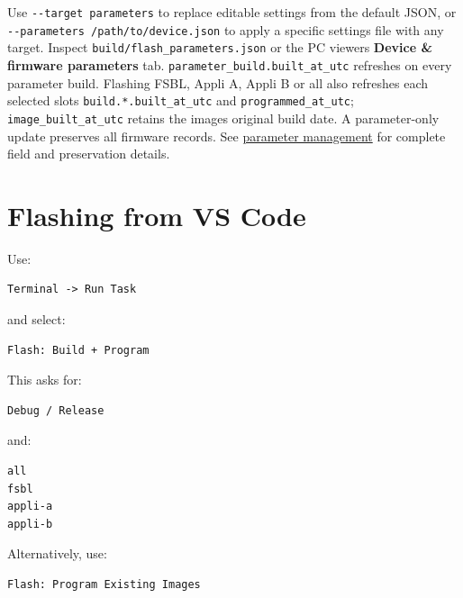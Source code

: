 \documentclass[10pt,a4paper,oneside]{report}
\begin{document}
Use \texttt{-\allowbreak{}-\allowbreak{}target parameters} to replace editable settings from the default JSON, or \texttt{-\allowbreak{}-\allowbreak{}parameters /\allowbreak{}path/\allowbreak{}to/\allowbreak{}device.\allowbreak{}json} to apply a specific settings file with any target. Inspect \texttt{build/\allowbreak{}flash\_\allowbreak{}parameters.\allowbreak{}json} or the PC viewer\textquotesingle s \textbf{Device \& firmware parameters} tab. \texttt{parameter\_\allowbreak{}build.\allowbreak{}built\_\allowbreak{}at\_\allowbreak{}utc} refreshes on every parameter build. Flashing FSBL, Appli A, Appli B or all also refreshes each selected slot\textquotesingle s \texttt{build.\allowbreak{}*.\allowbreak{}built\_\allowbreak{}at\_\allowbreak{}utc} and \texttt{programmed\_\allowbreak{}at\_\allowbreak{}utc}; \texttt{image\_\allowbreak{}built\_\allowbreak{}at\_\allowbreak{}utc} retains the image\textquotesingle s original build date. A parameter-only update preserves all firmware records. See \hyperref[wiki-firmware-parameters--device-parameters-and-build-metadata]{parameter management} for complete field and preservation details.

\section{Flashing from VS Code}\label{wiki-getting-started-build-flash-debug--6-flashing-from-vs-code}

Use:

\begin{verbatim}
Terminal -> Run Task
\end{verbatim}

and select:

\begin{verbatim}
Flash: Build + Program
\end{verbatim}

This asks for:

\begin{verbatim}
Debug / Release
\end{verbatim}

and:

\begin{verbatim}
all
fsbl
appli-a
appli-b
\end{verbatim}

Alternatively, use:

\begin{verbatim}
Flash: Program Existing Images
\end{verbatim}
\end{document}
